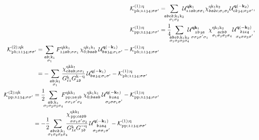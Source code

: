 \documentclass[../../main.tex]{subfiles}
\begin{document}
\begin{align}
 	\mathcal{K}^{(1);\q}_{\ph;\mathfrak{1234};\ss'}&=\!\!\!\sum_{\substack{\mathfrak{abcd};\k_1\k_2\\\sigma_1\sigma_2}} \!\!\!\mathcal{U}^{\vv{q}\vv{k}_1}_{\mathfrak{12ab};\ss_1}\chi^{\q\k_1\k_2}_{\mathfrak{badc};\sigma_1\sigma_2}\mathcal{U}^{\vv{q}(-\vv{k}_2)}_{\mathfrak{cd34};\sigma_2\sigma'},\label{eq:kernel_1}\\
 	\mathcal{K}^{(1);\q}_{\pp;\mathfrak{1234};\ss'}&=\frac14\!\!\!\sum_{\substack{\mathfrak{abcd};\k_1\k_2\\\sigma_1\sigma_2\sigma_3\sigma_4}} \!\!\!\mathcal{U}^{\vv{q}\vv{k}_1}_{\substack{\mathfrak{1b3a}\\\ss_2\sigma'\sigma_1}}\chi^{\q\k_1\k_2}_{\substack{\mathfrak{acbd}\\\sigma_1\sigma_3\sigma_2\sigma_4}}\mathcal{U}^{\vv{q}(-\vv{k}_2)}_{\substack{\mathfrak{d2c4}\\\sigma_4\sigma\sigma_3\sigma'}},\label{eq:kernel_1_pp}\\
\begin{split}\label{eq:kernel_2}
	\mathcal{K}^{(2);\q\k}_{\ph;\mathfrak{1234};\ss'}&=\sum_{\substack{\mathfrak{ab};\k_1\\\sigma_1}} F^{\q\k\k_1}_{\mathfrak{12ab};\ss_1}\,\chi^{\q\k_1\k_1}_{0;\mathfrak{baab}}\,\mathcal{U}^{\vv{q}(-\vv{k}_1)}_{\mathfrak{ba34};\sigma_1\sigma'}-\mathcal{K}^{(1);\q}_{\ph;\mathfrak{1234};\ss'}\\
	&=-\sum_{\substack{\mathfrak{ab};\k_1\\\sigma_1}} \frac{\chi^{\q\k\k_1}_{\mathfrak{cdab};\ss_1}}{G^{\k}_{\mathfrak{c1}}G^{\k-\q}_{\mathfrak{2d}}}\,\mathcal{U}^{\vv{q}(-\vv{k}_1)}_{\mathfrak{ba34};\sigma_1\sigma'}-\mathcal{K}^{(1);\q}_{\ph;\mathfrak{1234};\ss'}
\end{split}\\
\begin{split}\label{eq:kernel_2_pp}
	\mathcal{K}^{(2);\q\k}_{\pp;\mathfrak{1234};\ss'}&=\frac12\!\!\!\sum_{\substack{\mathfrak{ab};\k_1\\\sigma_1\sigma_2\sigma_3\sigma_4}} \!\!\!F^{\q\k\k_1}_{\substack{\pp;\mathfrak{1a3b}\\\sigma\sigma_1\sigma'\sigma_2}}\,\chi^{\q\k_1\k_1}_{0;\mathfrak{baab}}\,\mathcal{U}^{\vv{q}(-\vv{k}_1)}_{\substack{\mathfrak{b2a4}\\\sigma_2\sigma\sigma_1\sigma'}}-\mathcal{K}^{(1);\q}_{\pp;\mathfrak{1234};\ss'}\\
	&=-\frac12\!\!\!\sum_{\substack{\mathfrak{abcd};\k_1\\\sigma_1\sigma_2\sigma_3\sigma_4}}\!\!\! \frac{\chi^{\q\k\k_1}_{\substack{\pp;\mathfrak{cadb}\\\sigma\sigma_1\sigma'\sigma_2}}}{G^{\k}_{\mathfrak{1c}}G^{-\q}_{\mathfrak{3d}}}\,\mathcal{U}^{\vv{q}(-\vv{k}_1)}_{\substack{\mathfrak{b2a4}\\\sigma_2\sigma\sigma_1\sigma'}}-\mathcal{K}^{(1);\q}_{\pp;\mathfrak{1234};\ss'}
\end{split}
\end{align}
\end{document}
